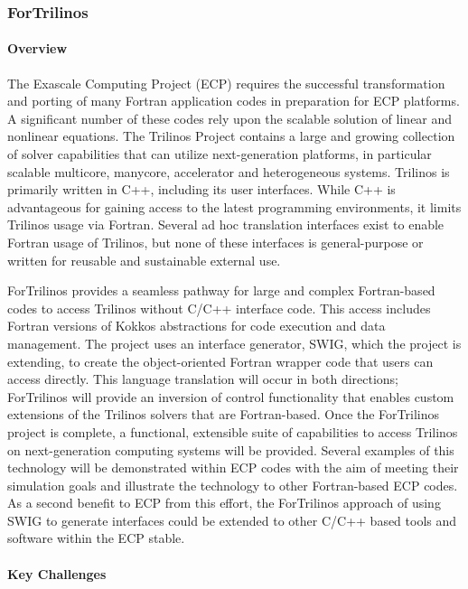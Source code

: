 \subsubsection{ ForTrilinos}

\paragraph{Overview}

The Exascale Computing Project (ECP) requires the successful transformation and porting of many Fortran application codes in preparation for ECP platforms. A significant number of these codes rely upon the scalable solution of linear and nonlinear equations. The Trilinos Project contains a large and growing collection of solver capabilities that can utilize next-generation platforms, in particular scalable multicore, manycore, accelerator and heterogeneous systems. Trilinos is primarily written in C++, including its user interfaces. While C++ is advantageous for gaining access to the latest programming environments, it limits Trilinos usage via Fortran. Several ad hoc translation interfaces exist to enable Fortran usage of Trilinos, but none of these interfaces is general-purpose or written for reusable and sustainable external use.

ForTrilinos provides a seamless pathway for large and complex Fortran-based
codes to access Trilinos without C/C++ interface code. This access includes
Fortran versions of Kokkos abstractions for code execution and data management.
The project uses an interface generator, SWIG, which the project is extending,
to create the object-oriented Fortran wrapper code that users can access directly. This language translation will occur in both directions; ForTrilinos will provide an inversion of control functionality that enables custom extensions of the Trilinos solvers that are Fortran-based. Once the ForTrilinos project is complete, a functional, extensible suite of capabilities to access Trilinos on next-generation computing systems will be provided. Several examples of this technology will be demonstrated within ECP codes with the aim of meeting their simulation goals and illustrate the technology to other Fortran-based ECP codes. As a second benefit to ECP from this effort, the ForTrilinos approach of using SWIG to generate interfaces could be extended to other C/C++ based tools and software within the ECP stable.

\paragraph{Key Challenges}

